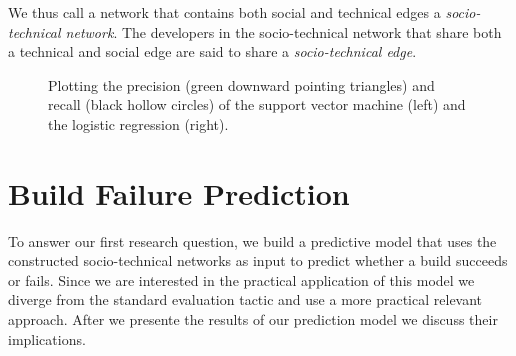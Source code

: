 We thus call a network that contains both social and technical edges a
\emph{socio-technical network}. The developers in the 
socio-technical network that share both a technical and social edge are said to share
a \emph{socio-technical edge}.











\begin{figure}[t]
\centering
{}
%
\caption{Plotting the precision (green downward pointing triangles) and recall (black hollow circles) of the support vector machine (left) and the logistic regression (right).}
\label{fig:prediction}
\end{figure}

\section{Build Failure Prediction}
\label{sec:prediction}
To answer our first research question, we build a predictive model that uses the
constructed socio-technical networks as input to predict whether a build succeeds
or fails. Since we are interested in the practical application of this model we
diverge from the standard evaluation tactic and use a more practical relevant
approach. After we presente the results of our prediction model we discuss their
implications.

